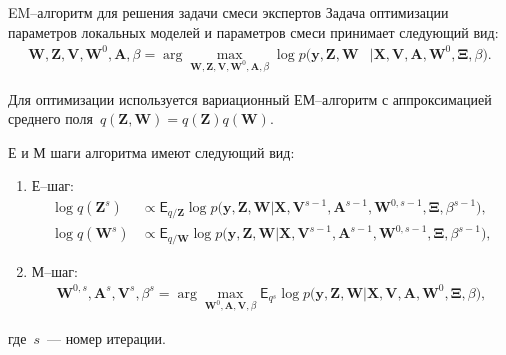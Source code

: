 \documentclass[9pt,pdf,hyperref={unicode}]{beamer}
\begin{document}
\begin{frame}{EM--алгоритм для решения задачи смеси экспертов}
\justifying
Задача оптимизации параметров локальных моделей и параметров смеси принимает следующий вид:
\begin{equation*}
\begin{aligned}
\mathbf{W}, \mathbf{Z}, \mathbf{V}, \mathbf{W}^0, \textbf{A},  \beta = \arg\max_{\mathbf{W}, \mathbf{Z}, \mathbf{V}, \mathbf{W}^0, \textbf{A}, \beta} \log p\bigr(\mathbf{y}, \mathbf{Z}, \mathbf{W}&|\mathbf{X}, \mathbf{V}, \textbf{A}, \textbf{W}^{0}, \bm{\Xi}, \beta\bigr).
\end{aligned}
\end{equation*}

Для оптимизации используется вариационный ЕМ--алгоритм с аппроксимацией среднего поля~$q\left(\textbf{Z}, \textbf{W}\right) = q\left(\textbf{Z}\right)q\left(\textbf{W}\right)$.

Е и М шаги алгоритма имеют следующий вид:
	\begin{enumerate}
		\item Е--шаг: 
			\begin{equation*}
				\begin{aligned}
					\log q\left(\textbf{Z}^{s}\right) &\propto \mathsf{E}_{q/\textbf{Z}}\log p\bigr(\mathbf{y}, \textbf{Z},\mathbf{W}|\mathbf{X}, \mathbf{V}^{s-1}, \textbf{A}^{s-1}, \textbf{W}^{0, s-1}, \bm{\Xi}, \beta^{s-1}\bigr),\\
					\log q\left(\textbf{W}^{s}\right) &\propto \mathsf{E}_{q/\textbf{W}}\log p\bigr(\mathbf{y}, \textbf{Z},\mathbf{W}|\mathbf{X}, \mathbf{V}^{s-1}, \textbf{A}^{s-1}, \textbf{W}^{0, s-1}, \bm{\Xi}, \beta^{s-1}\bigr),
				\end{aligned}
			\end{equation*}
		\item М--шаг: 
			\begin{equation*}
				\begin{aligned}
					\textbf{W}^{0, s}, \textbf{A}^{s}, \textbf{V}^{s}, \beta^{s} = \arg\max_{\textbf{W}^{0}, \textbf{A}, \textbf{V}, \beta} \mathsf{E}_{q^{s}}\log p\bigr(\mathbf{y}, \textbf{Z},\mathbf{W}|\mathbf{X}, \mathbf{V}, \textbf{A}, \textbf{W}^{0}, \bm{\Xi}, \beta\bigr),
				\end{aligned}
			\end{equation*}
	\end{enumerate}
	где~$s$~--- номер итерации.
\end{frame}
\end{document}

